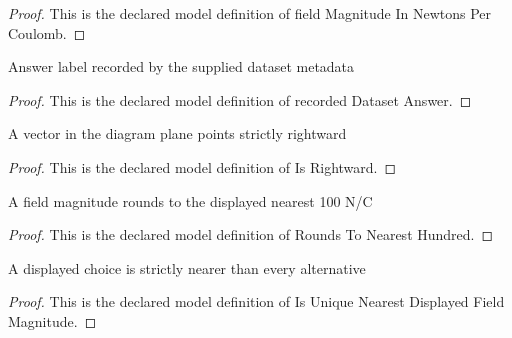 \begin{proof}
  This is the declared model definition of field Magnitude In Newtons Per Coulomb.
\end{proof}
\begin{definition}
  \label{def:physics:phyx-mini-0994:phyxminiproblems-problemphyxmini0994-recordeddatasetanswer}
  Answer label recorded by the supplied dataset metadata
\end{definition}
\begin{proof}
  This is the declared model definition of recorded Dataset Answer.
\end{proof}
\begin{definition}[Is Rightward]
  \label{def:physics:phyx-mini-0994:phyxminiproblems-problemphyxmini0994-isrightward}
  A vector in the diagram plane points strictly rightward
\end{definition}
\begin{proof}
  This is the declared model definition of Is Rightward.
\end{proof}
\begin{definition}
  \label{def:physics:phyx-mini-0994:phyxminiproblems-problemphyxmini0994-roundstonearesthundred}
  A field magnitude rounds to the displayed nearest 100 N/C
\end{definition}
\begin{proof}
  This is the declared model definition of Rounds To Nearest Hundred.
\end{proof}
\begin{definition}
  \label{def:physics:phyx-mini-0994:phyxminiproblems-problemphyxmini0994-isuniquenearestdisplayedfieldmagnitude}
  A displayed choice is strictly nearer than every alternative
\end{definition}
\begin{proof}
  This is the declared model definition of Is Unique Nearest Displayed Field Magnitude.
\end{proof}
